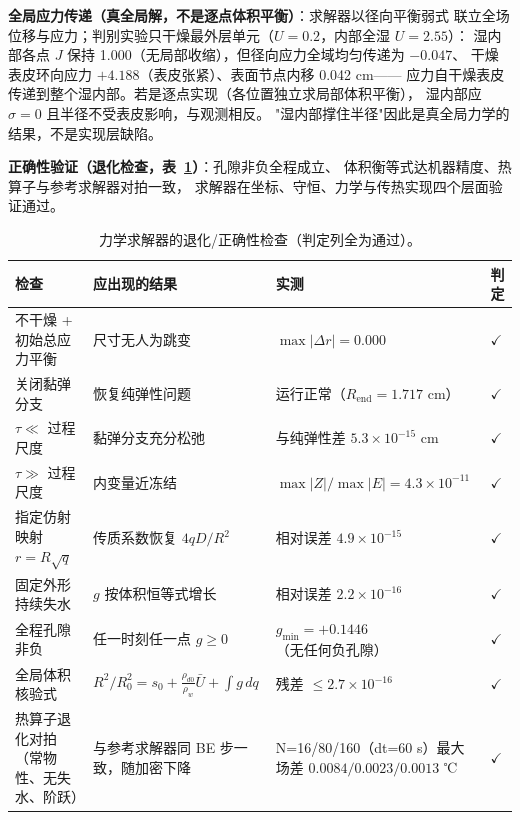 \documentclass[12pt,a4paper]{ctexart}
\numberwithin{equation}{section}
\begin{document}
\textbf{全局应力传递（真全局解，不是逐点体积平衡）}：求解器以径向平衡弱式
联立全场位移与应力；判别实验只干燥最外层单元（$U=0.2$，内部全湿 $U=2.55$）：
湿内部各点 $J$ 保持 1.000（无局部收缩），但径向应力全域均匀传递为 $-0.047$、
干燥表皮环向应力 $+4.188$（表皮张紧）、表面节点内移 0.042 cm——
应力自干燥表皮传递到整个湿内部。若是逐点实现（各位置独立求局部体积平衡），
湿内部应 $\sigma=0$ 且半径不受表皮影响，与观测相反。
"湿内部撑住半径"因此是真全局力学的结果，不是实现层缺陷。

\textbf{正确性验证（退化检查，表~\ref{tab:力学退化}）}：孔隙非负全程成立、
体积衡等式达机器精度、热算子与参考求解器对拍一致，
求解器在坐标、守恒、力学与传热实现四个层面验证通过。

\begin{table}[htbp]
\centering
\caption{力学求解器的退化/正确性检查（判定列全为通过）。}
\label{tab:力学退化}
\small
\begin{tabular}{>{\raggedright\arraybackslash}p{4.05cm}>{\raggedright\arraybackslash}p{4.00cm}>{\raggedright\arraybackslash}p{5.30cm}>{\raggedright\arraybackslash}p{0.85cm}}
\toprule
检查 & 应出现的结果 & 实测 & 判定 \\
\midrule
不干燥 + 初始总应力平衡 & 尺寸无人为跳变 & $\max|\Delta r|=0.000$ & $\checkmark$ \\
关闭黏弹分支 & 恢复纯弹性问题 & 运行正常（$R_{\mathrm{end}}=1.717$ cm） & $\checkmark$ \\
$\tau\ll$ 过程尺度 & 黏弹分支充分松弛 & 与纯弹性差 $5.3\times10^{-15}$ cm & $\checkmark$ \\
$\tau\gg$ 过程尺度 & 内变量近冻结 & $\max|Z|/\max|E|=4.3\times10^{-11}$ & $\checkmark$ \\
指定仿射映射 $r=R\sqrt q$ & 传质系数恢复 $4qD/R^2$ & 相对误差 $4.9\times10^{-15}$ & $\checkmark$ \\
固定外形持续失水 & $g$ 按体积恒等式增长 & 相对误差 $2.2\times10^{-16}$ & $\checkmark$ \\
全程孔隙非负 & 任一时刻任一点 $g\ge0$ & $g_{\min}=+0.1446$（无任何负孔隙） & $\checkmark$ \\
全局体积核验式 & $R^2/R_0^2=s_0+\frac{\rho_{d0}}{\rho_w}\bar U+\int g\,dq$ & 残差 $\le2.7\times10^{-16}$ & $\checkmark$ \\
热算子退化对拍（常物性、无失水、阶跃） & 与参考求解器同 BE 步一致，随加密下降 &
N=16/80/160（dt=60 s）最大场差 $0.0084/0.0023/0.0013$ ℃ & $\checkmark$ \\
\bottomrule
\end{tabular}
\end{table}
\end{document}
